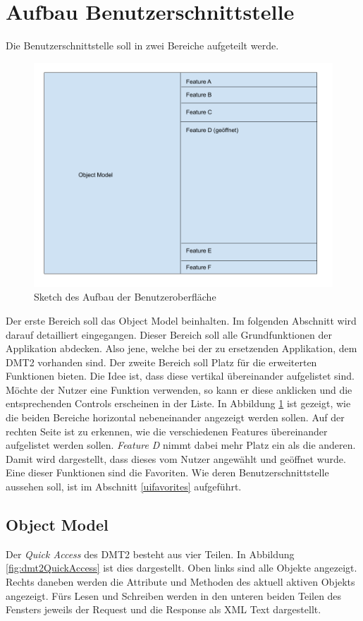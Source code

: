 \section{Aufbau Benutzerschnittstelle}\label{aufbauUI}
Die Benutzerschnittstelle soll in zwei Bereiche aufgeteilt werde.
\begin{figure}[H]
   \centering
   \includegraphics[width=1.0\textwidth]{gfx/App strucutre sketch.png}
   \caption{
      Sketch des Aufbau der Benutzeroberfläche
      }
      \label{fig:uisketch}
   \end{figure}
Der erste Bereich soll das Object Model beinhalten.
Im folgenden Abschnitt wird darauf detailliert eingegangen.
Dieser Bereich soll alle Grundfunktionen der Applikation abdecken.
Also jene, welche bei der zu ersetzenden Applikation, dem \ac{DMT2} vorhanden sind.
Der zweite Bereich soll Platz für die erweiterten Funktionen bieten.
Die Idee ist, dass diese vertikal übereinander aufgelistet sind.
Möchte der Nutzer eine Funktion verwenden, so kann er diese anklicken und die entsprechenden Controls erscheinen in der Liste.
In Abbildung \ref{fig:uisketch} ist gezeigt, wie die beiden Bereiche horizontal nebeneinander angezeigt werden sollen.
Auf der rechten Seite ist zu erkennen, wie die verschiedenen Features übereinander aufgelistet werden sollen.
\textit{Feature D} nimmt dabei mehr Platz ein als die anderen.
Damit wird dargestellt, dass dieses vom Nutzer angewählt und geöffnet wurde.
Eine dieser Funktionen sind die Favoriten.
Wie deren Benutzerschnittstelle aussehen soll, ist im Abschnitt \ref{uifavorites} aufgeführt.

\subsection{Object Model}
Der \textit{Quick Access} des \ac{DMT2} besteht aus vier Teilen.
In Abbildung \ref{fig:dmt2QuickAccess} ist dies dargestellt.
Oben links sind alle Objekte angezeigt.
Rechts daneben werden die Attribute und Methoden des aktuell aktiven Objekts angezeigt.
Fürs Lesen und Schreiben werden in den unteren beiden Teilen des Fensters jeweils der Request und die Response als XML Text dargestellt.

